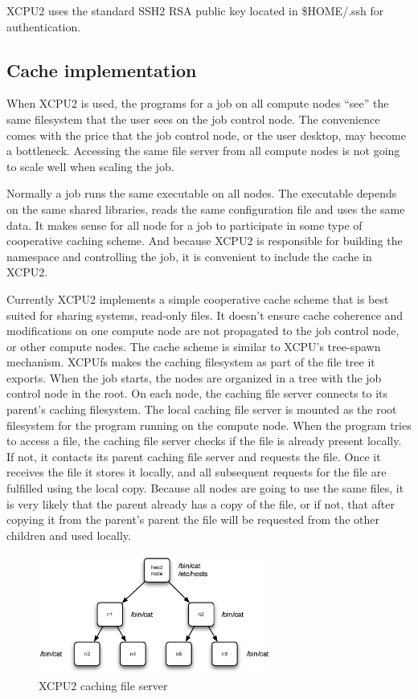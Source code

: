 \documentclass[10pt,conference,letterpaper]{IEEEtran}
\begin{document}
XCPU2 uses the standard SSH2 RSA public key located in \$HOME/.ssh for
authentication.

\subsection{Cache implementation}

When XCPU2 is used, the programs for a job on all compute nodes ``see'' the
same filesystem that the user sees on the job control node. The convenience
comes with the price that the job control node, or the user desktop, may
become a bottleneck. Accessing the same file server from all compute nodes
is not going to scale well when scaling the job. 

Normally a job runs the same executable on all nodes. The executable depends
on the same shared libraries, reads the same configuration file and uses the
same data. It makes sense for all node for a job to participate in some type
of cooperative caching scheme. And because XCPU2 is responsible for building
the namespace and controlling the job, it is convenient to include the cache
in XCPU2. 

Currently XCPU2 implements a simple cooperative cache scheme that is best
suited for sharing systems, read-only files. It doesn't ensure cache
coherence and modifications on one compute node are not propagated to the
job control node, or other compute nodes. The cache scheme is similar to
XCPU's tree-spawn mechanism. XCPUfs makes the caching filesystem as part of
the file tree it exports. When the job starts, the nodes are organized in
a tree with the job control node in the root. On each node, the caching file
server connects to its parent's caching filesystem. The local caching file
server is mounted as the root filesystem for the program running on the
compute node. When the program tries to access a file, the caching file
server checks if the file is already present locally. If not, it contacts
its parent caching file server and requests the file. Once it receives the
file it stores it locally, and all subsequent requests for the file are
fulfilled using the local copy. Because all nodes are going to use the same
files, it is very likely that the parent already has a copy of the file, or
if not, that after copying it from the parent's parent the file will be
requested from the other children and used locally.

\begin{figure}[h]
\begin{center}
\includegraphics[width=3in, keepaspectratio]{xcpu2-cache.eps}
\end{center}
\caption{XCPU2 caching file server}
\label{fig:XCPU2-cache}
\end{figure}
\end{document}
